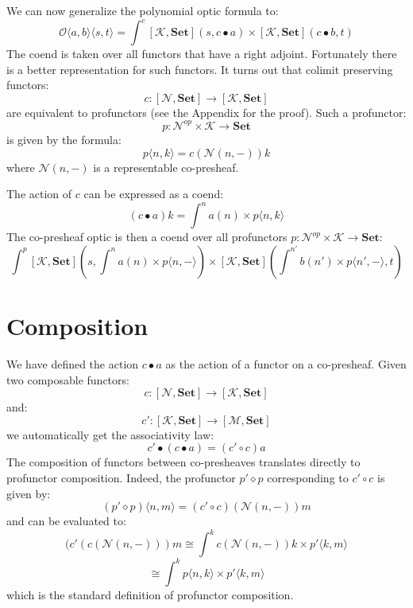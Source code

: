 \documentclass[11pt]{amsart}
\newcommand{\cat}[1]{\mathcal{#1}}%
\newcommand{\Cat}[1]{\mathbf{#1}}%
\newcommand{\Set}{\Cat{Set}}
\begin{document}
We can now generalize the polynomial optic formula to:
\[ \mathcal{O}\langle a, b\rangle \langle s, t \rangle = \int^{c} 
 [\cat K, \Set] \left(s,  c \bullet a \right) \times 
 [\cat K, \Set] \left(c \bullet b, t \right) \]
The coend is taken over all functors that have a right adjoint. Fortunately there is a better representation for such functors. It turns out that colimit preserving functors:
\[ c \colon [\cat N, \Set] \to [\cat K, \Set] \]
are equivalent to profunctors (see the Appendix for the proof). Such a profunctor:
\[ p \colon \cat N^{op} \times \cat K \to \Set \]
is given by the formula:
\[p \langle n, k \rangle = c ( \cat N(n, -)) k \]
where $\cat N(n, -)$ is a representable co-presheaf.

The action of $c$ can be expressed as a coend:
\[ (c \bullet a) k = \int^{n} a(n) \times p \langle n, k \rangle \]
The co-presheaf optic is then a coend over all profunctors $p \colon \cat N^{op} \times \cat K \to \Set$:
\[ \int^{p} 
 [\cat K, \Set] \left(s,  \int^{n} a(n) \times p \langle n, - \rangle \right) \times 
 [\cat K, \Set] \left(\int^{n'} b(n') \times p \langle n', - \rangle, t \right) \]
 
 \section{Composition}
 
 We have defined the action $c \bullet a$ as the action of a functor on a co-presheaf. Given two composable functors:
\[ c \colon  [\cat N, \Set] \to [\cat K, \Set] \]
and:
\[ c' \colon  [\cat K, \Set] \to [\cat M, \Set] \]
we automatically get the associativity law:
\[ c' \bullet (c \bullet a) = (c' \circ c) a \]
The composition of functors between co-presheaves translates directly to profunctor composition. Indeed, the profunctor $p' \diamond p$ corresponding to $c' \circ c$ is given by:
\[(p' \diamond p) \langle n, m \rangle = (c' \circ c) ( \cat N(n, -)) m \]
and can be evaluated to:
\[(c' ( c ( \cat N(n, -))) m 
 \cong \int^{k} c ( \cat N(n, -)) k \times p' \langle k, m \rangle \]
\[  \cong \int^{k} p \langle n, k \rangle \times p' \langle k, m \rangle \]
which is the standard definition of profunctor composition. 
\end{document}
